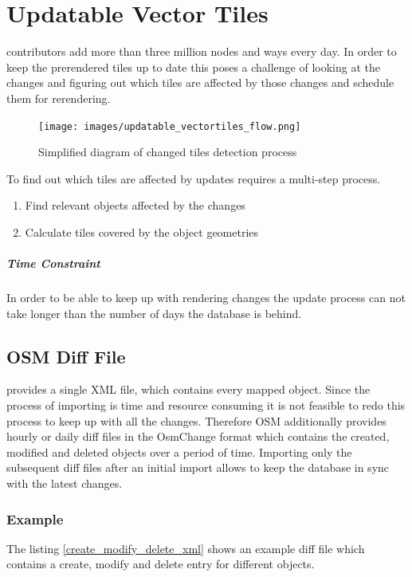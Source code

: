 \chapter{Updatable Vector Tiles}

\osm{} contributors add more than three million nodes and ways every day.
In order to keep the prerendered tiles up to date this poses a challenge of looking at the changes
and figuring out which tiles are affected by those changes and schedule them for rerendering.

\begin{figure}[H]
  \centering
  \texttt{[image: images/updatable\_vectortiles\_flow.png]}
  \caption{Simplified diagram of changed tiles detection process}
\end{figure}

To find out which tiles are affected by updates requires a multi-step process.

\begin{enumerate}
    \item Find relevant \osm{} objects affected by the changes
    \item Calculate tiles covered by the object geometries
\end{enumerate}

\paragraph{Time Constraint} In order to be able to keep up with rendering changes the update process can not take longer than the number of days the database is behind.

\section{OSM Diff File}

\osm{} provides a single XML file, which contains every mapped object. Since the process of importing is time and resource consuming it is not feasible to redo this process to keep up with all the changes. Therefore OSM additionally provides hourly or daily diff files in the OsmChange format which contains the created, modified and deleted objects over a period of time. Importing only the subsequent diff files after an initial import allows to keep the database in sync with the latest changes.

\subsection*{Example}
The listing \autoref{create_modify_delete_xml} shows an example diff file which contains a create, modify and delete entry for different objects.

